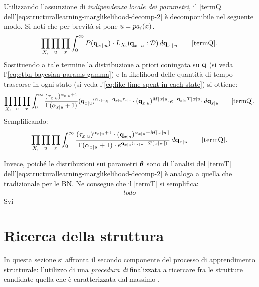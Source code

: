 Utilizzando l'assunzione di \emph{indipendenza locale dei parametri}, il \autoref{termQ} dell'\autoref{eq:structurallearning-marglikelihood-decomp-2} è decomponibile nel seguente modo. Si noti che per brevità si pone $\mathnormal{u}=pa_i(\mathnormal{x})$.
\[
\prod_{\setel{X}_i} \prod_{\setel{u}} \prod_{\setel{x}} \int_0^\infty P(\param{q}_{\setel{x}\,\arrowvert\,\setel{u}}) \cdot L_{\setel{X}_i}(\param{q}_{\setel{x}\,\arrowvert\,\setel{u}}:\conceptsym{D}) \, d\param{q}_{\setel{x}\,\arrowvert\,\setel{u}} \tag*{\ref{termQ}} \text{.}
\]
Sostituendo a tale termine la distribuzione a priori coniugata su $\boldsymbol{\textbf{\text{q}}}$ (si veda l'\autoref{eq:ctbn-bayesian-params-gamma}) e la likelihood delle quantità di tempo trascorse in ogni stato (si veda l'\autoref{eq:like-time-spent-in-each-state}) si ottiene:
\footnotesize
\[
\prod_{\setel{X}_i} \prod_{\setel{u}} \prod_{\setel{x}} \int_0^\infty \frac{(\tau_{\setel{x}\arrowvert\setel{u}})^{\alpha_{\setel{x}\arrowvert\setel{u}}+1}}{\Gamma({\alpha_{\setel{x}\arrowvert\setel{u}}+1})} (\param{q}_{\setel{x}\arrowvert\setel{u}})^{\alpha_{\setel{x}\arrowvert\setel{u}}} e^{-\param{q}_{\setel{x}\arrowvert\setel{u}}\tau_{\setel{x}\arrowvert\setel{u}}} \cdot (\param{q}_{x\arrowvert\setel{u}})^{\mstat{x\arrowvert\setel{u}}} e^{-\param{q}_{\setel{x}\arrowvert\setel{u}}\tstat{\setel{x}\arrowvert\setel{u}}} \, d\param{q}_{\setel{x}\arrowvert\setel{u}} \tag*{\ref{termQ}} \text{\normalsize .}
\]
\normalsize
Semplificando:
\[
\prod_{\setel{X}_i} \prod_{\setel{u}} \prod_{\setel{x}} \int_0^\infty \frac{(\tau_{\setel{x}\arrowvert\setel{u}})^{\alpha_{\setel{x}\arrowvert\setel{u}}+1} \cdot (\param{q}_{\setel{x}\arrowvert\setel{u}})^{\alpha_{\setel{x}\arrowvert\setel{u}}+\mstat{x\arrowvert\setel{u}}}}{\Gamma({\alpha_{\setel{x}\arrowvert\setel{u}}+1}) \cdot e^{\param{q}_{\setel{x}\arrowvert\setel{u}}(\tau_{\setel{x}\arrowvert\setel{u}}+\tstat{\setel{x}\arrowvert\setel{u}})}}  \, d\param{q}_{\setel{x}\arrowvert\setel{u}} \tag*{\ref{termQ}} \text{\normalsize .}
\]

\omissis{}

Invece, poiché le distribuzioni sui parametri $\boldsymbol{\textbf{\text{$\theta$}}}$ sono di \emph{} l'analisi del \autoref{termT} dell'\autoref{eq:structurallearning-marglikelihood-decomp-2} è analoga a quella che tradizionale per le \acl{BN}. Ne consegue che il \autoref{termT} si semplifica:
\begin{align}\label{eq:marglike-int-theta}
todo
\end{align}
Svi

\section{Ricerca della struttura}\label{sec:structurallearning-search}
In questa sezione si affronta il secondo componente del processo di apprendimento strutturale: l'utilizzo di una \emph{procedura di } finalizzata a ricercare fra le strutture candidate quella che è caratterizzata dal massimo \emph{}.

